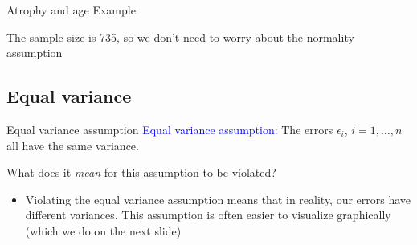 \documentclass[10pt,t]{beamer}
\begin{document}
\begin{frame}{Atrophy and age Example}

The sample size is 735, so we don't need to worry about the normality assumption

\end{frame}

\subsection{Equal variance}

\begin{frame}{Equal variance assumption}
\textcolor{blue}{Equal variance assumption:} The errors $\epsilon_i$, $i = 1, \dots, n$ all have the same variance.

\vspace{0.3cm}

What does it \textit{mean} for this assumption to be violated?

\begin{itemize}
	\item[] Violating the equal variance assumption means that in reality, our errors have different variances. This assumption is often easier to visualize graphically (which we do on the next slide)
\end{itemize}

\end{frame}
\end{document}
